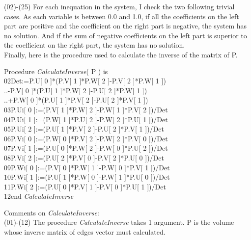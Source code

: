 \documentclass[12pt, a4paper]{article}
\begin{document}
(02)-(25) For each inequation in the system, I check the two following trivial cases. As each variable is between 0.0 and 1.0, if all the coefficients on the left part are positive and the coefficient on the right part is negative, the system has no solution. And if the sum of negative coefficients on the left part is superior to the coefficient on the right part, the system has no solution. \\

Finally, here is the procedure used to calculate the inverse of the matrix of P.\\

\begin{ttfamily}
\quad Procedure {\em CalculateInverse}( P ) is\\
02\quad\quad Det:=P.U[ 0 ]*(P.V[ 1 ]*P.W[ 2 ]-P.V[ 2 ]*P.W[ 1 ])\\
..\quad\quad\quad -P.V[ 0 ]*(P.U[ 1 ]*P.W[ 2 ]-P.U[ 2 ]*P.W[ 1 ])\\
..\quad\quad\quad +P.W[ 0 ]*(P.U[ 1 ]*P.V[ 2 ]-P.U[ 2 ]*P.V[ 1 ])\\
03\quad\quad P.Ui[ 0 ]:=(P.V[ 1 ]*P.W[ 2 ]-P.W[ 1 ]*P.V[ 2 ])/Det\\
04\quad\quad P.Ui[ 1 ]:=(P.W[ 1 ]*P.U[ 2 ]-P.W[ 2 ]*P.U[ 1 ])/Det\\
05\quad\quad P.Ui[ 2 ]:=(P.U[ 1 ]*P.V[ 2 ]-P.U[ 2 ]*P.V[ 1 ])/Det\\
06\quad\quad P.Vi[ 0 ]:=(P.W[ 0 ]*P.V[ 2 ]-P.W[ 2 ]*P.V[ 0 ])/Det\\
07\quad\quad P.Vi[ 1 ]:=(P.U[ 0 ]*P.W[ 2 ]-P.W[ 0 ]*P.U[ 2 ])/Det\\
08\quad\quad P.Vi[ 2 ]:=(P.U[ 2 ]*P.V[ 0 ]-P.V[ 2 ]*P.U[ 0 ])/Det\\
09\quad\quad P.Wi[ 0 ]:=(P.V[ 0 ]*P.W[ 1 ]-P.W[ 0 ]*P.V[ 1 ])/Det\\
10\quad\quad P.Wi[ 1 ]:=(P.U[ 1 ]*P.W[ 0 ]-P.W[ 1 ]*P.U[ 0 ])/Det\\
11\quad\quad P.Wi[ 2 ]:=(P.U[ 0 ]*P.V[ 1 ]-P.V[ 0 ]*P.U[ 1 ])/Det\\
12\quad end {\em CalculateInverse}\\
\end{ttfamily}

Comments on {\em CalculateInverse}:\\

(01)-(12) The procedure {\em CalculateInverse} takes 1 argument. P is the volume whose inverse matrix of edges vector must calculated.\\
\end{document}
